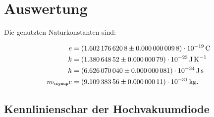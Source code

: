 \section{Auswertung}
\label{sec:Auswertung}

Die genutzten Naturkonstanten \cite{Codata} sind:

\begin{align*}
  e &= \SI{1.6021766208(98)e-19}{\coulomb}\\
  k &= \SI{1.38064852(79)e-23}{\joule\per\kelvin}\\
  h &= \SI{6.626070040(81)e-34}{\joule\second}\\
  m_\g{e} &= \SI{9.10938356(11)e-31}{\kilo\gram}.
\end{align*}

\subsection{Kennlinienschar der Hochvakuumdiode}
\label{sec:kennlinien}

